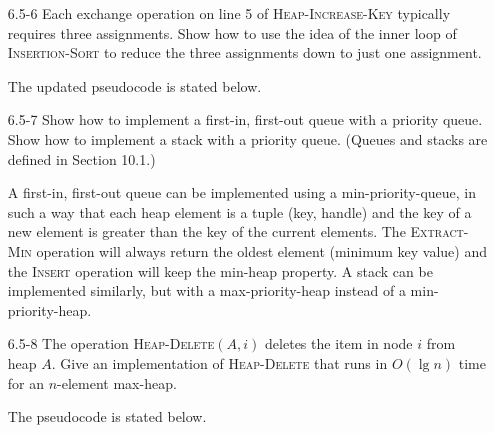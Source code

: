\documentclass{report}
\makeatletter
\renewenvironment{framed}{%
 \def\FrameCommand##1{\hskip\@totalleftmargin
 \fboxsep=\FrameSep\fbox{##1}}%
 \MakeFramed {\advance\hsize-\width
   \@totalleftmargin\z@ \linewidth\hsize
   \@setminipage}}%
 {\par\unskip\endMakeFramed}
\makeatother
\begin{document}
\begin{enumerate}
\item[6.5{-}6]{Each exchange operation on line 5 of \textsc{Heap-Increase-Key}
typically requires three assignments. Show how to use the idea of the inner
loop of \textsc{Insertion-Sort} to reduce the three assignments down to just one
assignment.}

\begin{framed}
The updated pseudocode is stated below.

\begin{algorithm}[H]
\SetAlgoNoEnd\DontPrintSemicolon
\BlankLine
{}
\end{algorithm}
\end{framed}

\item[6.5{-}7]{Show how to implement a first-in, first-out queue with a priority
queue. Show how to implement a stack with a priority queue. (Queues and stacks
are defined in Section 10.1.)}

\begin{framed}
A first-in, first-out queue can be implemented using a min-priority-queue, in
such a way that each heap element is a tuple (key, handle) and the key of a new
element is greater than the key of the current elements. The
\textsc{Extract-Min} operation will always return the oldest element (minimum
key value) and the \textsc{Insert} operation will keep the min-heap property.
A stack can be implemented similarly, but with a max-priority-heap instead of
a min-priority-heap.
\end{framed}

\item[6.5{-}8]{The operation \textsc{Heap-Delete}$(A, i)$ deletes the item in
node $i$ from heap $A$. Give an implementation of \textsc{Heap-Delete} that runs
in $O(\lg n)$ time for an $n$-element max-heap.}

\begin{framed}
The pseudocode is stated below.

\begin{algorithm}[H]
\SetAlgoNoEnd\DontPrintSemicolon
\BlankLine
{}
\end{algorithm}
\end{framed}


\end{enumerate}
\end{document}

